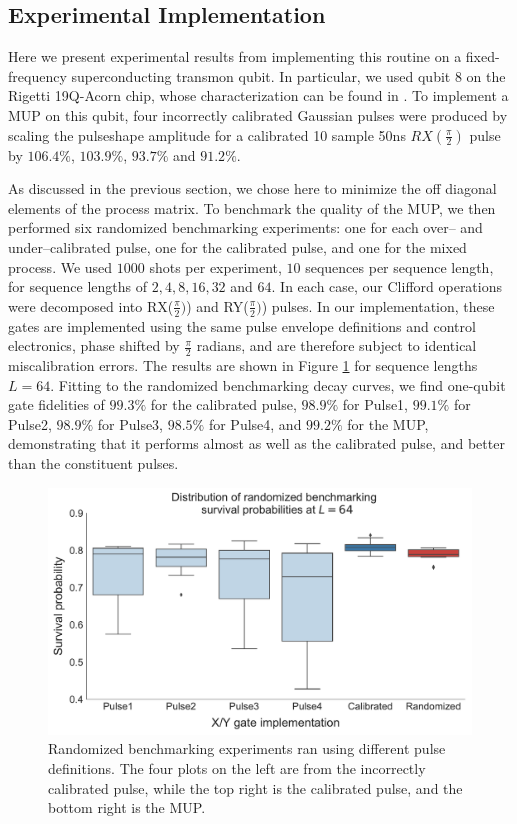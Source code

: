 \documentclass[aps,nofootinbib,pra,notitlepage,twocolumn]{revtex4-1}
\begin{document}
\subsection{Experimental Implementation}
\label{sec:experimental_results}
Here we present experimental results from implementing this routine on a fixed-frequency superconducting transmon qubit. In particular, we used qubit 8 on the Rigetti 19Q-Acorn chip, whose characterization can be found in \cite{1712.05771}. To implement a MUP on this qubit, four incorrectly calibrated Gaussian pulses were produced by scaling the pulseshape amplitude for a calibrated 10 sample 50ns $RX(\frac{\pi}{2})$ pulse by $106.4\%$,  $103.9\%$, $93.7\%$ and $91.2\%$.

As discussed in the previous section, we chose here to minimize the off diagonal elements of the process matrix. To benchmark the quality of the MUP, we then performed six randomized benchmarking experiments\cite{Magesan2011}: one for each over-- and under--calibrated pulse, one for the calibrated pulse, and one for the mixed process. We used $1000$ shots per experiment, $10$ sequences per sequence length, for sequence lengths of $2, 4, 8, 16, 32$ and $64$. In each case, our Clifford operations were decomposed into RX($\frac{\pi}{2})$) and RY($\frac{\pi}{2})$) pulses. In our implementation, these gates are implemented using the same pulse envelope definitions and control electronics, phase shifted by $\frac{\pi}{2}$ radians, and are therefore subject to identical miscalibration errors. The results are shown in Figure \ref{fig:rb} for sequence lengths $L=64$. Fitting to the randomized benchmarking decay curves, we find one-qubit gate fidelities of $99.3\%$ for the calibrated pulse, $98.9\%$ for Pulse1, $99.1\%$ for Pulse2, $98.9\%$ for Pulse3, $98.5\%$ for Pulse4, and $99.2\%$ for the MUP, demonstrating that it performs almost as well as the calibrated pulse, and better than the constituent pulses. 
\begin{figure}[t]
  \centering
  \includegraphics[width=\columnwidth]{rb_data.pdf}
  \caption{Randomized benchmarking experiments ran using different pulse definitions. The four plots on the left are from the incorrectly calibrated pulse, while the top right is the calibrated pulse, and the bottom right is the MUP.}
  \label{fig:rb}
\end{figure}
\end{document}

